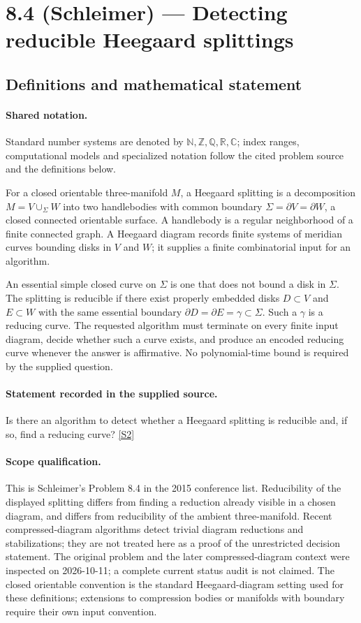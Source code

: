 \documentclass[11pt]{article}
\newcommand{\sref}[2]{\hyperlink{source:#1:#2}{[S#2]}}
\begin{document}
\section{8.4 (Schleimer) — Detecting reducible Heegaard splittings}\label{statement}

\subsection{Definitions and mathematical statement}

\paragraph{Shared notation.}Standard number systems are denoted by $\mathbb N,\mathbb Z,\mathbb Q,\mathbb R,\mathbb C$; index ranges, computational models and specialized notation follow the cited problem source and the definitions below.


For a closed orientable three-manifold $M$, a Heegaard splitting is a decomposition $M=V\cup_\Sigma W$ into two handlebodies with common boundary $\Sigma=\partial V=\partial W$, a closed connected orientable surface. A handlebody is a regular neighborhood of a finite connected graph. A Heegaard diagram records finite systems of meridian curves bounding disks in $V$ and $W$; it supplies a finite combinatorial input for an algorithm.

An essential simple closed curve on $\Sigma$ is one that does not bound a disk in $\Sigma$. The splitting is reducible if there exist properly embedded disks $D\subset V$ and $E\subset W$ with the same essential boundary $\partial D=\partial E=\gamma\subset\Sigma$. Such a $\gamma$ is a reducing curve. The requested algorithm must terminate on every finite input diagram, decide whether such a curve exists, and produce an encoded reducing curve whenever the answer is affirmative. No polynomial-time bound is required by the supplied question.
\paragraph{Statement recorded in the supplied source.}
Is there an algorithm to detect whether a Heegaard splitting is reducible and, if so, find a reducing curve? \sref{statement}{2}
\paragraph{Scope qualification.}
This is Schleimer's Problem 8.4 in the 2015 conference list. Reducibility of the displayed splitting differs from finding a reduction already visible in a chosen diagram, and differs from reducibility of the ambient three-manifold. Recent compressed-diagram algorithms detect trivial diagram reductions and stabilizations; they are not treated here as a proof of the unrestricted decision statement. The original problem and the later compressed-diagram context were inspected on 2026-10-11; a complete current status audit is not claimed. The closed orientable convention is the standard Heegaard-diagram setting used for these definitions; extensions to compression bodies or manifolds with boundary require their own input convention.
\end{document}
